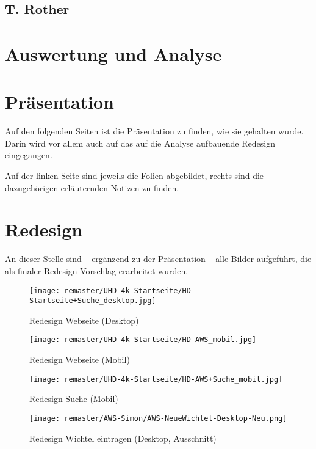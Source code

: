 \documentclass{scrreprt}
\begin{document}
\section{T. Rother}


\clearpage

\chapter{Auswertung und Analyse}


\chapter{Präsentation}
Auf den folgenden Seiten ist die Präsentation zu finden, wie sie gehalten wurde. Darin wird vor allem auch auf das auf die Analyse aufbauende Redesign eingegangen.

Auf der linken Seite sind jeweils die Folien abgebildet, rechts sind die dazugehörigen erläuternden Notizen zu finden.


\chapter{Redesign}
An dieser Stelle sind -- ergänzend zu der Präsentation -- alle Bilder aufgeführt, die als finaler Redesign-Vorschlag erarbeitet wurden.
\begin{figure}[!ht]
\centering
\texttt{[image: remaster/UHD-4k-Startseite/HD-Startseite+Suche\_desktop.jpg]}
\caption{Redesign Webseite (Desktop)}
\end{figure}

\begin{figure}[!ht]
\centering
\texttt{[image: remaster/UHD-4k-Startseite/HD-AWS\_mobil.jpg]}
\caption{Redesign Webseite (Mobil)}
\end{figure}

\begin{figure}[!ht]
\centering
\texttt{[image: remaster/UHD-4k-Startseite/HD-AWS+Suche\_mobil.jpg]}
\caption{Redesign Suche (Mobil)}
\end{figure}

\begin{figure}[!ht]
\centering
\texttt{[image: remaster/AWS-Simon/AWS-NeueWichtel-Desktop-Neu.png]}
\caption{Redesign Wichtel eintragen (Desktop, Ausschnitt)}
\end{figure}
\end{document}
